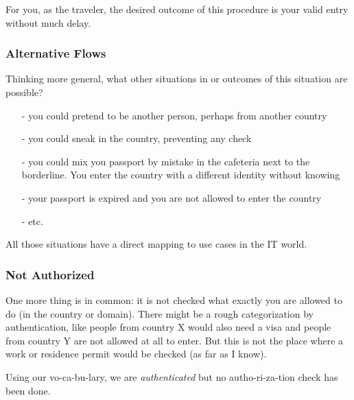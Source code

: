 For you, as the traveler, the desired outcome of this procedure is your
valid entry without much delay.


\subsubsection{Alternative Flows}

Thinking more general, what other situations in or outcomes of this
situation are possible?

\begin{itemize}
    \item[-] you could pretend to be another person, perhaps from another 
        country
    \item[-] you could sneak in the country, preventing any check
    \item[-] you could mix you passport by mistake in the cafeteria next 
        to the borderline.  You enter the country with a different identity 
        without knowing
    \item[-] your passport is expired and you are not allowed to enter the country
    \item[-] etc.
\end{itemize}

All those situations have a direct mapping to use cases in the IT world.

\subsubsection{Not Authorized}

One more thing is in common: it is not checked what exactly you are
allowed to do (in the country or domain). There might be a rough
categorization by authentication, like people from country X would also
need a visa and people from country Y are not allowed at all to enter.
But this is not the place where a work or residence permit would be
checked (as far as I know).

Using our vo-ca-bu-lary, we are \emph{authenticated} but no autho-ri-za-tion
check has been done.

